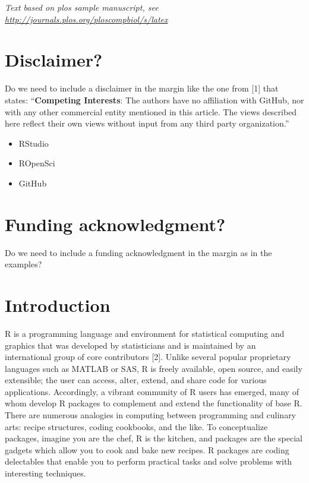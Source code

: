 \documentclass[10pt,letterpaper]{article}
\providecommand{\tightlist}{%
  \setlength{\itemsep}{0pt}\setlength{\parskip}{0pt}}
\begin{document}
\linenumbers

\emph{Text based on plos sample manuscript, see
\url{http://journals.plos.org/ploscompbiol/s/latex}}

\hypertarget{disclaimer}{%
\section{Disclaimer?}\label{disclaimer}}

Do we need to include a disclaimer in the margin like the one from
{[}1{]} that states: ``\textbf{Competing Interests}: The authors have no
affiliation with GitHub, nor with any other commercial entity mentioned
in this article. The views described here reflect their own views
without input from any third party organization.''

\begin{itemize}
\tightlist
\item
  RStudio
\item
  ROpenSci
\item
  GitHub
\end{itemize}

\hypertarget{funding-acknowledgment}{%
\section{Funding acknowledgment?}\label{funding-acknowledgment}}

Do we need to include a funding acknowledgment in the margin as in the
examples?

\hypertarget{introduction}{%
\section{Introduction}\label{introduction}}

R is a programming language and environment for statistical computing
and graphics that was developed by statisticians and is maintained by an
international group of core contributors {[}2{]}. Unlike several popular
proprietary languages such as MATLAB or SAS, R is freely available, open
source, and easily extensible; the user can access, alter, extend, and
share code for various applications. Accordingly, a vibrant community of
R users has emerged, many of whom develop R packages to complement and
extend the functionality of base R. There are numerous analogies in
computing between programming and culinary arts: recipe structures,
coding cookbooks, and the like. To conceptualize packages, imagine you
are the chef, R is the kitchen, and packages are the special gadgets
which allow you to cook and bake new recipes. R packages are coding
delectables that enable you to perform practical tasks and solve
problems with interesting techniques.
\end{document}
